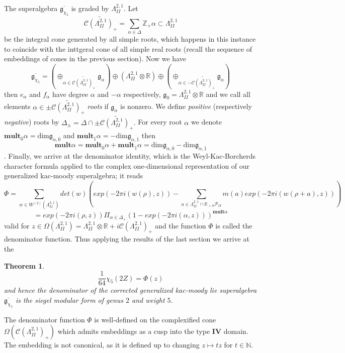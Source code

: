 \documentclass[9pt]{amsart} \usepackage[utf8]{inputenc}
\newtheorem{theorem}{Theorem}
\newcommand{\N}{\mathbb{N}}
\newcommand{\Z}{\mathbb{Z}} \newcommand{\C}{\mathbb{C}}
\newcommand{\R}{\mathbb{R}} \newcommand{\La}{\Lambda}
\newcommand{\IV}{\mathbf{IV}}
\newcommand{\Cone}{\mathcal{C}}
\newcommand{\Poly}{\mathcal{P}}
\begin{document}
The superalgebra $\overline{\mathfrak{g}_{\chi_5}}$ is graded by
$\La^{2,1}_{II}$. Let $$\widetilde{\Cone(\La^{2,1}_{II})_+} =
\sum_{\alpha \in \Delta} \Z_+\alpha \subset \La^{2,1}_{II}$$ be the
integral cone generated by all simple roots, which happens in this
instance to coincide with the inttgeral cone of all simple real roots
(recall the sequence of embeddings of cones in the previous section).
Now we have $$\overline{\mathfrak{g}_{\chi_5}} = (\oplus_{\alpha \in
\widetilde{\Cone(\La^{2,1}_{II})_+}} \mathfrak{g}_{\alpha}) \oplus
(\La^{2,1}_{II} \otimes \R) \oplus (\oplus_{\alpha \in
-\widetilde{\Cone(\La^{2,1}_{II})_+}} \mathfrak{g}_{\alpha})$$
 then $e_{\alpha}$ and $f_{\alpha}$ have degree
$\alpha$ and $-\alpha$ respectively, $\mathfrak{g}_0 = \La^{2,1}_{II}
\otimes \R$ and we call all elements $\alpha \in
\pm\widetilde{\Cone(\La^{2,1}_{II})_+}$ \textit{roots} if
$\mathfrak{g}_{\alpha}$ is nonzero. We define \textit{positive}
(respectively \textit{negative}) roots by $\Delta_{\pm} = \Delta \cap
\pm\widetilde{\Cone(\La^{2,1}_{II})_+}.$ For every root $\alpha$ we
denote $\textbf{mult}_{\overline{0}}\alpha =
\textrm{dim}\mathfrak{g}_{\alpha,\overline{0}}$ and
$\textbf{mult}_{\overline{1}}\alpha =
-\textrm{dim}\mathfrak{g}_{\alpha,\overline{1}}$ then
$$\textbf{mult}\alpha = \textbf{mult}_{\overline{0}}\alpha +
\textbf{mult}_{\overline{1}}\alpha = \textrm{dim}
\mathfrak{g}_{\alpha,\overline{0}} -
\textrm{dim}\mathfrak{g}_{\alpha,\overline{1}}$$.
Finally, we arrive at the denominator identity, which is the
Weyl-Kac-Borcherds character formula applied to the complex
one-dimensional representation of our generalized kac-moody
superalgebra; it reads $$\Phi = \sum_{w \in W^{(2)}(\La^{2,1}_{II})} det(w)
(exp(-2\pi i(w(\rho), z)) - \sum_{a\in \La^{2,1}_{II} \cap \R_{>0}
\Poly_{II}} m(a) exp(-2\pi i(w(\rho + a), z)) ) $$ $$= exp(-2\pi i(\rho,z))
\Pi_{\alpha \in \Delta_+} (1 - exp(-2\pi i
(\alpha,z)))^{\textbf{mult}\alpha}$$ valid for $z \in
\Omega(\La^{2,1}_{II}) = \La^{2,1}_{II} \otimes \R + i
\Cone(\La^{2,1}_{II})_+$ and the function $\Phi$ is called the
denominator function.  Thus applying the results of the last section we
arrive at the

\begin{theorem}
  $$\frac{1}{64}\chi_5(2Z) = \Phi(z)$$
  and hence the denominator of the \textit{corrected} generalized
  kac-moody lie superalgebra $\overline{\mathfrak{g}_{\chi_5}}$ is the
  siegel modular form of genus $2$ and weight $5$.
\end{theorem}

The denominator function $\Phi$ is well-defined on the complexified cone
$\Omega(\Cone(\La^{2,1}_{II})_+)$ which admits embeddings as a cusp into
the type $\IV$ domain. The embedding is not canonical, as it is defined
up to changing $z\mapsto tz$ for $t\in \N$.
\end{document}

